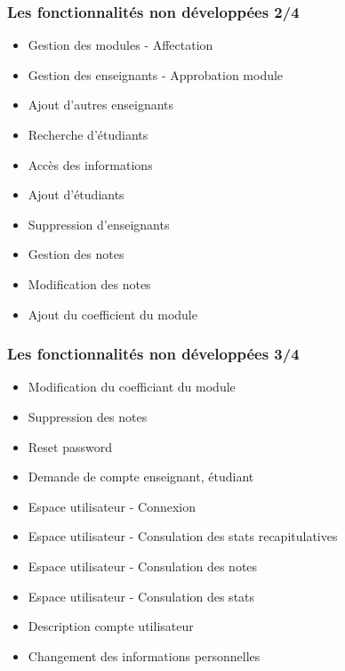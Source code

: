 \documentclass{beamer}
\begin{document}
    \begin{frame}
      \frametitle{Les fonctionnalités non développées 2/4}
      \begin{block}{}
        \begin{itemize}
          \item Gestion des modules - Affectation
          \item Gestion des enseignants - Approbation module
          \item Ajout d'autres enseignants
          \item Recherche d'étudiants
          \item Accès des informations
          \item Ajout d'étudiants
          \item Suppression d'enseignants
          \item Gestion des notes
          \item Modification des notes
          \item Ajout du coefficient du module
        \end{itemize}
      \end{block}
    \end{frame}
    \begin{frame}
      \frametitle{Les fonctionnalités non développées 3/4}
      \begin{block}{}
        \begin{itemize}
          \item Modification du coefficiant du module
          \item Suppression des notes
          \item Reset password
          \item Demande de compte enseignant, étudiant
          \item Espace utilisateur - Connexion
          \item Espace utilisateur - Consulation des stats recapitulatives
          \item Espace utilisateur - Consulation des notes
          \item Espace utilisateur - Consulation des stats
          \item Description compte utilisateur
          \item Changement des informations personnelles
        \end{itemize}
      \end{block}
    \end{frame}
\end{document}
